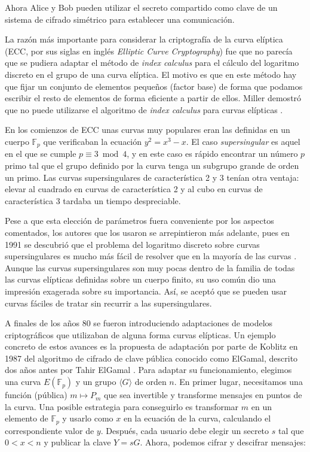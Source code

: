 \documentclass[
  a4paper,
  12pt,
  spanish,
]{scrartcl}
\begin{document}
Ahora Alice y Bob pueden utilizar el secreto compartido como clave de un sistema de cifrado simétrico para establecer una comunicación.

La razón más importante para considerar la criptografía de la curva elíptica (ECC, por sus siglas en inglés \textit{Elliptic Curve Cryptography}) fue que no parecía que se pudiera adaptar el método de \textit{index calculus} para el cálculo del logaritmo discreto en el grupo de una curva elíptica. El motivo es que en este método hay que fijar un conjunto de elementos pequeños (factor base) de forma que podamos escribir el resto de elementos de forma eficiente a partir de ellos. Miller demostró que no puede utilizarse el algoritmo de \textit{index calculus} para curvas elípticas \parencite{williams_use_1986}.

En los comienzos de ECC unas curvas muy populares eran las definidas en un cuerpo $\mathbb{F}_p$ que verificaban la ecuación $y^2 = x^3 - x$. El caso \textit{supersingular} es aquel en el que se cumple $p \equiv 3 \bmod 4$, y en este caso es rápido encontrar un número $p$ primo tal que el grupo definido por la curva tenga un subgrupo grande de orden un primo. Las curvas supersingulares de característica 2 y 3 tenían otra ventaja: elevar al cuadrado en curvas de característica 2 y al cubo en curvas de característica 3 tardaba un tiempo despreciable.

Pese a que esta elección de parámetros fuera conveniente por los aspectos comentados, los autores que los usaron se arrepintieron más adelante, pues en 1991 se descubrió que el problema del logaritmo discreto sobre curvas supersingulares es mucho más fácil de resolver que en la mayoría de las curvas \parencite[785]{koblitz_elliptic_2011}. Aunque las curvas supersingulares son muy pocas dentro de la familia de todas las curvas elípticas definidas sobre un cuerpo finito, su uso común dio una impresión exagerada sobre su importancia. Así, se aceptó que se pueden usar curvas fáciles de tratar sin recurrir a las supersingulares.

A finales de los años 80 se fueron introduciendo adaptaciones de modelos criptográficos que utilizaban de alguna forma curvas elípticas. Un ejemplo concreto de estos avances es la propuesta de adaptación por parte de Koblitz en 1987 \parencite{koblitz_elgamal_1987} del algoritmo de cifrado de clave pública conocido como ElGamal, descrito dos años antes por Tahir ElGamal \parencite{elgamal_cryptosytem_1985}. Para adaptar su funcionamiento, elegimos una curva $E(\mathbb{F}_p)$ y un grupo $\langle G \rangle$ de orden $n$. En primer lugar, necesitamos una función (pública) $m \mapsto P_m$ que sea invertible y transforme mensajes en puntos de la curva. Una posible estrategia para conseguirlo es transformar $m$ en un elemento de $\mathbb{F}_p$ y usarlo como $x$ en la ecuación de la curva, calculando el correspondiente valor de $y$. Después, cada usuario debe elegir un secreto \(s\) tal que $0 < x < n$ y publicar la clave $Y = sG$. Ahora, podemos cifrar y descifrar mensajes:
\end{document}

